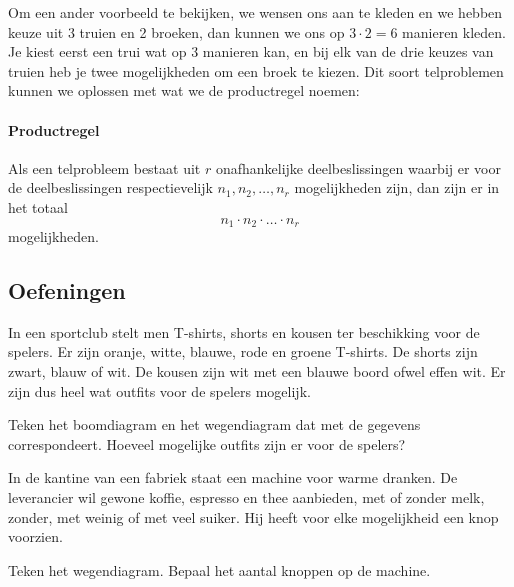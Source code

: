 \documentclass[12pt,twoside]{article}
\begin{document}
Om een ander voorbeeld te bekijken, we wensen ons aan te kleden en we hebben keuze uit 3 truien en 2 broeken, dan kunnen we ons op $3\cdot 2 = 6$ manieren kleden. Je kiest eerst een trui wat op 3 manieren kan, en bij elk van de drie keuzes van truien heb je twee mogelijkheden om een broek te kiezen. Dit soort telproblemen kunnen we oplossen met wat we de productregel noemen:

\paragraph*{Productregel}
\begin{mdframed}
Als een telprobleem bestaat uit $r$ onafhankelijke deelbeslissingen waarbij er voor de deelbeslissingen respectievelijk $n_1, n_2, \ldots, n_r$ mogelijkheden zijn, dan zijn er in het totaal
$$n_1\cdot n_2\cdot \ldots \cdot n_r$$
mogelijkheden.
\end{mdframed}

\subsection{Oefeningen}

\begin{oefening}
In een sportclub stelt men T-shirts, shorts en kousen ter beschikking voor de spelers. Er zijn oranje, witte, blauwe, rode en groene T-shirts. De shorts zijn zwart, blauw of wit. De kousen zijn wit met een blauwe boord ofwel effen wit. Er zijn dus heel wat outfits voor de spelers mogelijk.

Teken het boomdiagram en het wegendiagram dat met de gegevens correspondeert. Hoeveel mogelijke outfits zijn er voor de spelers?
\end{oefening}

\begin{oefening}
In de kantine van een fabriek staat een machine voor warme dranken. De leverancier wil gewone koffie, espresso en thee aanbieden, met of zonder melk, zonder, met weinig of met veel suiker. Hij heeft voor elke mogelijkheid een knop voorzien.

Teken het wegendiagram. Bepaal het aantal knoppen op de machine.
\end{oefening}
\end{document}
